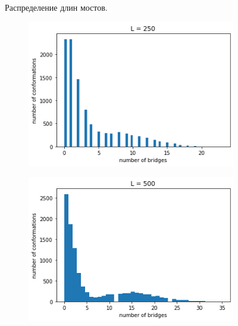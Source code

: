 \begin{figure}[H]
\begin{subfigure}[t]{0.3\textwidth}
	\end{subfigure}
	\caption{Распределение длин мостов.}
\end{figure}

\begin{figure}[H]
	\centering
	\begin{subfigure}[t]{0.3\textwidth} 
		\includegraphics[width=\textwidth]{../images/bridges_count_L250.png} 
	\end{subfigure}
	\begin{subfigure}[t]{0.3\textwidth} 
		\includegraphics[width=\textwidth]{../images/bridges_count_L500.png} 
	\end{subfigure}
	\begin{subfigure}[t]{0.3\textwidth} 

\end{subfigure}
\end{figure}
